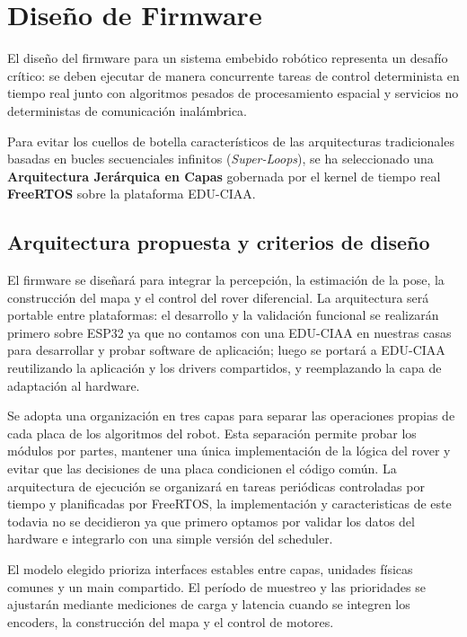 \newcommand{\ruta}[1]{\texttt{#1}}
\section{Diseño de Firmware}

El diseño del firmware para un sistema embebido robótico representa un desafío crítico: se deben ejecutar de manera concurrente tareas de control determinista en tiempo real junto con algoritmos pesados de procesamiento espacial y servicios no deterministas de comunicación inalámbrica.

Para evitar los cuellos de botella característicos de las arquitecturas tradicionales basadas en bucles secuenciales infinitos (\textit{Super-Loops}), se ha seleccionado una \textbf{Arquitectura Jerárquica en Capas} gobernada por el kernel de tiempo real \textbf{FreeRTOS} sobre la plataforma EDU-CIAA.

\subsection{Arquitectura propuesta y criterios de diseño}

El firmware se diseñará para integrar la percepción, la estimación de la pose,
la construcción del mapa y el control del rover diferencial. La arquitectura
será portable entre plataformas: el desarrollo y la validación funcional se
realizarán primero sobre ESP32 ya que no contamos con una EDU-CIAA en nuestras casas para desarrollar y probar software de aplicación; luego se portará a EDU-CIAA reutilizando la
aplicación y los drivers compartidos, y reemplazando la capa de adaptación al
hardware.

Se adopta una organización en tres capas para separar las operaciones propias
de cada placa de los algoritmos del robot. Esta separación permite probar los
módulos por partes, mantener una única implementación de la lógica del rover y
evitar que las decisiones de una placa condicionen el código común. La
arquitectura de ejecución se organizará en tareas periódicas controladas por
tiempo y planificadas por FreeRTOS, la implementación y caracteristicas de este todavia no se decidieron ya que primero optamos por validar los datos del hardware e integrarlo con una simple versión del scheduler.

El modelo elegido prioriza interfaces estables entre capas, unidades físicas
comunes y un main compartido. El período de muestreo y las prioridades se
ajustarán mediante mediciones de carga y latencia cuando se integren los
encoders, la construcción del mapa y el control de motores.


